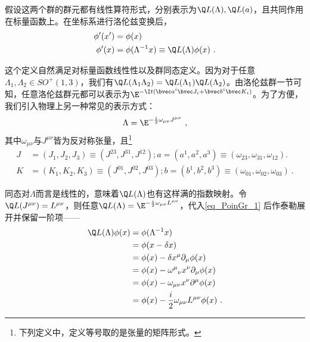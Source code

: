 假设这两个群的群元都有线性算符形式，分别表示为$\Q L(\Lambda),\Q L(a)$，且共同作用在标量函数上。在坐标系进行洛伦兹变换后，
\begin{equation}\label{eq_PoinGr_1}
\begin{aligned}
\phi'(x')&=\phi(x)\\
\phi'(x)&=\phi(\Lambda^{-1}x)\equiv \Q L(\Lambda)\phi(x)~.
\end{aligned}
\end{equation}

这个定义自然满足对标量函数线性性以及群同态定义。因为对于任意$\Lambda_1,\Lambda_2\in SO^+(1,3)$，我们有$\Q L(\Lambda_1\Lambda_2)=\Q L(\Lambda_1)\Q L(\Lambda_2)$。由洛伦兹群一节可知，任意洛伦兹群元都可以表示为$\E^{-\I t(\bvec a^i\bvec J_i+\bvec b^i\bvec K_i)}$。为了方便，我们引入物理上另一种常见的表示方式：
\begin{equation}
\Lambda=\E^{-\frac{i}{2} \omega_{\mu \nu} J^{\mu \nu}}
~,
\end{equation}
其中$\omega_{\mu\nu}$与$J^{\mu\nu}$皆为反对称张量，且\footnote{下列定义中，定义等号取的是张量的矩阵形式。}
\begin{equation}
\begin{aligned}
J&=(J_1,J_2,J_3)\equiv(J^{23},J^{31},J^{12});a=(a^1,a^2,a^3)\equiv(\omega_{23},\omega_{31},\omega_{12}).\\
K&=(K_1,K_2,K_3)\equiv(J^{01},J^{02},J^{03});b=(b^1,b^2,b^3)\equiv(\omega_{01},\omega_{02},\omega_{03})~.
\end{aligned}
\end{equation}


同态对$\Lambda$而言是线性的，意味着$\Q L(\Lambda)$也有这样满的指数映射。令$\Q L(J^{\mu \nu})=L^{\mu \nu}$，则任意$\Q L(\Lambda)=\E^{-\frac{i}{2} \omega_{\mu \nu} L^{\mu \nu}}$，代入\autoref{eq_PoinGr_1} 后作泰勒展开并保留一阶项——
\begin{equation}
\begin{aligned}
\Q L(\Lambda)\phi(x)&=\phi(\Lambda^{-1}x)\\
&=\phi(x-\delta x)\\
&= \phi(x)-\delta x^{\mu} \partial_{\mu} \phi(x) \\
&= \phi(x)-\omega^{\mu}{ }_{\nu} x^{\nu} \partial_{\mu} \phi(x) \\
&=\phi(x)-\omega_{\mu \nu} x^{\nu} \partial^{\mu} \phi(x) \\
&= \phi(x)-\frac{i}{2} \omega_{\mu \nu} L^{\mu \nu} \phi(x)~.
\end{aligned}
\end{equation}






